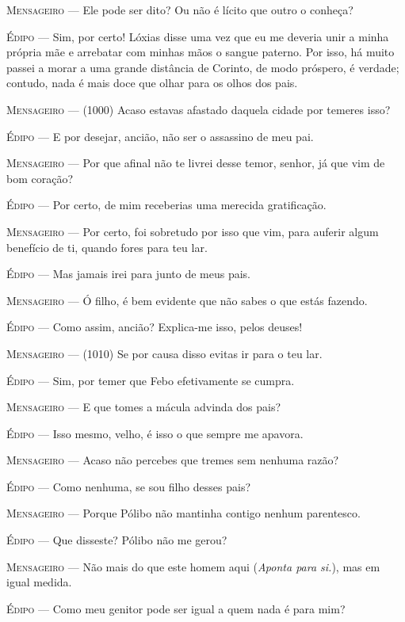 \textsc{Mensageiro} --- Ele pode ser dito? Ou não é lícito que outro o conheça?

\textsc{Édipo} --- Sim, por certo! Lóxias disse uma vez que eu me deveria unir a minha
própria mãe e arrebatar com minhas mãos o sangue paterno. Por isso, há
muito passei a morar a uma grande distância de Corinto, de modo
próspero, é verdade; contudo, nada é mais doce que olhar para os olhos
dos pais.

\textsc{Mensageiro} --- (1000) Acaso estavas afastado daquela cidade por temeres isso?

\textsc{Édipo} --- E por desejar, ancião, não ser o assassino de meu pai.

\textsc{Mensageiro} --- Por que afinal não te livrei desse temor, senhor, já que vim de bom
coração?

\textsc{Édipo} --- Por certo, de mim receberias uma merecida gratificação.

\textsc{Mensageiro} --- Por certo, foi sobretudo por isso que vim, para auferir algum benefício
de ti, quando fores para teu lar.

\textsc{Édipo} --- Mas jamais irei para junto de meus pais.

\textsc{Mensageiro} --- Ó filho, é bem evidente que não sabes o que estás fazendo.

\textsc{Édipo} --- Como assim, ancião? Explica-me isso, pelos deuses!

\textsc{Mensageiro} --- (1010) Se por causa disso evitas ir para o teu lar.

\textsc{Édipo} --- Sim, por temer que Febo efetivamente se cumpra.

\textsc{Mensageiro} --- E que tomes a mácula advinda dos pais?

\textsc{Édipo} --- Isso mesmo, velho, é isso o que sempre me apavora.

\textsc{Mensageiro} --- Acaso não percebes que tremes sem nenhuma razão?

\textsc{Édipo} --- Como nenhuma, se sou filho desses pais?

\textsc{Mensageiro} --- Porque Pólibo não mantinha contigo nenhum parentesco.

\textsc{Édipo} --- Que disseste? Pólibo não me gerou?

\textsc{Mensageiro} --- Não mais do que este homem aqui (\emph{Aponta para si.}), mas em igual
medida.

\textsc{Édipo} --- Como meu genitor pode ser igual a quem nada é para mim?

